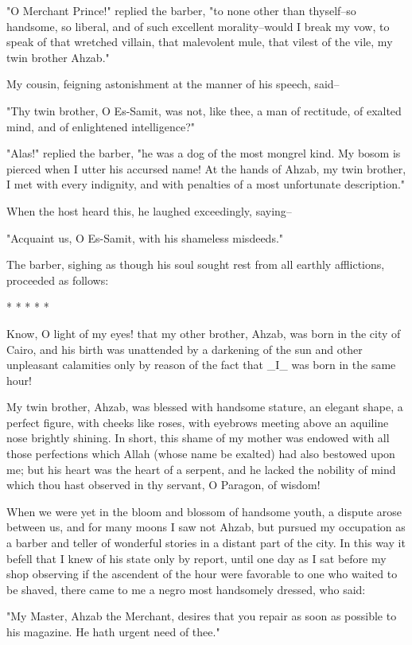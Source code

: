 "O Merchant Prince!" replied the barber, "to none other than
thyself--so handsome, so liberal, and of such excellent
morality--would I break my vow, to speak of that wretched villain,
that malevolent mule, that vilest of the vile, my twin brother
Ahzab."

My cousin, feigning astonishment at the manner of his speech, said--

"Thy twin brother, O Es-Samit, was not, like thee, a man of rectitude,
of exalted mind, and of enlightened intelligence?"

"Alas!" replied the barber, "he was a dog of the most mongrel kind. My
bosom is pierced when I utter his accursed name! At the hands of
Ahzab, my twin brother, I met with every indignity, and with penalties
of a most unfortunate description."

When the host heard this, he laughed exceedingly, saying--

"Acquaint us, O Es-Samit, with his shameless misdeeds."

The barber, sighing as though his soul sought rest from all earthly
afflictions, proceeded as follows:

       *       *       *       *       *

Know, O light of my eyes! that my other brother, Ahzab, was born in
the city of Cairo, and his birth was unattended by a darkening of the
sun and other unpleasant calamities only by reason of the fact that
_I_ was born in the same hour!

My twin brother, Ahzab, was blessed with handsome stature, an elegant
shape, a perfect figure, with cheeks like roses, with eyebrows meeting
above an aquiline nose brightly shining. In short, this shame of my
mother was endowed with all those perfections which Allah (whose name
be exalted) had also bestowed upon me; but his heart was the heart of
a serpent, and he lacked the nobility of mind which thou hast
observed in thy servant, O Paragon, of wisdom!

When we were yet in the bloom and blossom of handsome youth, a dispute
arose between us, and for many moons I saw not Ahzab, but pursued my
occupation as a barber and teller of wonderful stories in a distant
part of the city. In this way it befell that I knew of his state only
by report, until one day as I sat before my shop observing if the
ascendent of the hour were favorable to one who waited to be shaved,
there came to me a negro most handsomely dressed, who said:

"My Master, Ahzab the Merchant, desires that you repair as soon as
possible to his magazine. He hath urgent need of thee."

